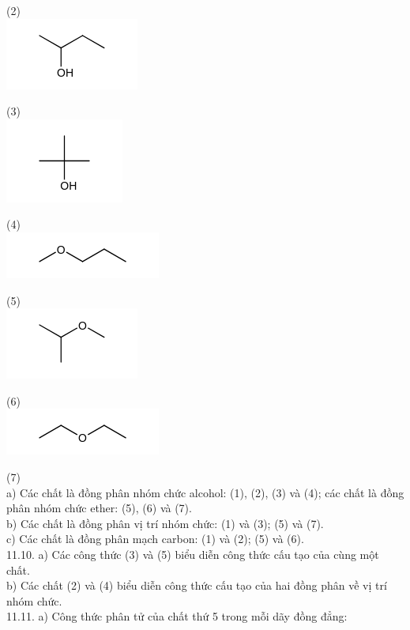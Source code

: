 \documentclass[10pt]{article}
\begin{document}
(2)\\
\includegraphics{smile-851d53338a0e757377fa90edda63c2906e8241fb}

(3)\\
\includegraphics{smile-bb658aa506421f9fef30d09cf0df9a58904004bf}

(4)\\
\includegraphics{smile-6e7ab1620e01424c09b8eeffcb3abda84e991995}

(5)\\
\includegraphics{smile-e01a6bfee9bd42c113f98a2c51781996ed8650b6}

(6)\\
\includegraphics{smile-22c9be8c4ce3883b1a7db805dd1fd6b6d1722c8d}

(7)\\
a) Các chất là đồng phân nhóm chức alcohol: (1), (2), (3) và (4); các chất là đồng phân nhóm chức ether: (5), (6) và (7).\\
b) Các chất là đồng phân vị trí nhóm chức: (1) và (3); (5) và (7).\\
c) Các chất là đồng phân mạch carbon: (1) và (2); (5) và (6).\\
11.10. a) Các công thức (3) và (5) biểu diễn công thức cấu tạo của cùng một chất.\\
b) Các chất (2) và (4) biểu diễn công thức cấu tạo của hai đồng phân về vị trí nhóm chức.\\
11.11. a) Công thức phân tử của chất thứ 5 trong mỗi dãy đồng đẳng:
\end{document}
